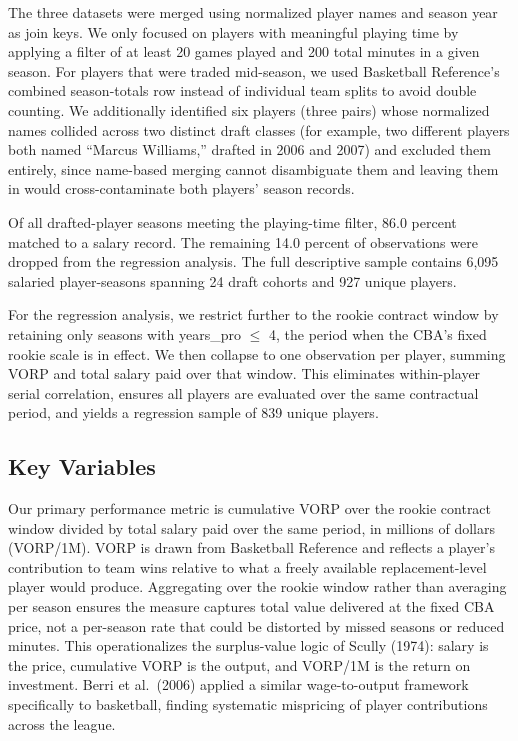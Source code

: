 \documentclass[12pt,letterpaper]{article}
\begin{document}
The three datasets were merged using normalized player names and season year as join keys. We only focused on players with meaningful playing time by applying a filter of at least 20 games played and 200 total minutes in a given season. For players that were traded mid-season, we used Basketball Reference's combined season-totals row instead of individual team splits to avoid double counting. We additionally identified six players (three pairs) whose normalized names collided across two distinct draft classes (for example, two different players both named ``Marcus Williams,'' drafted in 2006 and 2007) and excluded them entirely, since name-based merging cannot disambiguate them and leaving them in would cross-contaminate both players' season records.

Of all drafted-player seasons meeting the playing-time filter, 86.0 percent matched to a salary record. The remaining 14.0 percent of observations were dropped from the regression analysis. The full descriptive sample contains 6,095 salaried player-seasons spanning 24 draft cohorts and 927 unique players.

For the regression analysis, we restrict further to the rookie contract window by retaining only seasons with years\_pro $\leq$ 4, the period when the CBA's fixed rookie scale is in effect. We then collapse to one observation per player, summing VORP and total salary paid over that window. This eliminates within-player serial correlation, ensures all players are evaluated over the same contractual period, and yields a regression sample of 839 unique players.


\subsection{Key Variables}

Our primary performance metric is cumulative VORP over the rookie contract window divided by total salary paid over the same period, in millions of dollars (VORP/1M). VORP is drawn from Basketball Reference and reflects a player's contribution to team wins relative to what a freely available replacement-level player would produce. Aggregating over the rookie window rather than averaging per season ensures the measure captures total value delivered at the fixed CBA price, not a per-season rate that could be distorted by missed seasons or reduced minutes. This operationalizes the surplus-value logic of Scully (1974): salary is the price, cumulative VORP is the output, and VORP/1M is the return on investment. Berri et al.\ (2006) applied a similar wage-to-output framework specifically to basketball, finding systematic mispricing of player contributions across the league.
\end{document}
